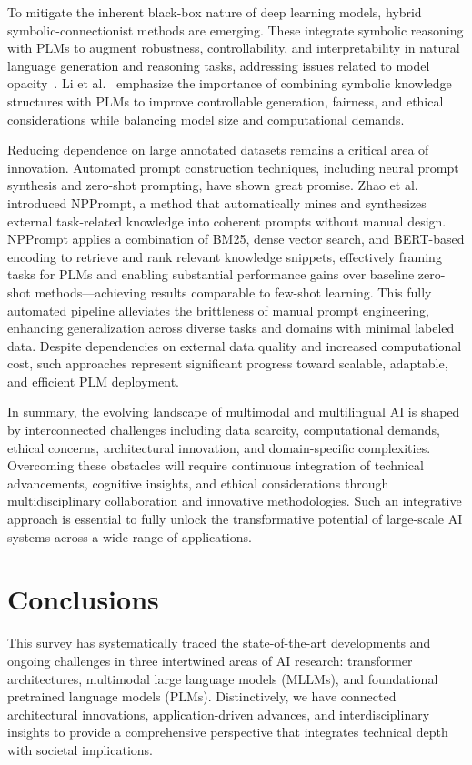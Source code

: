 \documentclass[sigconf]{acmart}
\begin{document}
To mitigate the inherent black-box nature of deep learning models, hybrid symbolic-connectionist methods are emerging. These integrate symbolic reasoning with PLMs to augment robustness, controllability, and interpretability in natural language generation and reasoning tasks, addressing issues related to model opacity~\cite{ref39}. Li et al.~\cite{ref39} emphasize the importance of combining symbolic knowledge structures with PLMs to improve controllable generation, fairness, and ethical considerations while balancing model size and computational demands.

Reducing dependence on large annotated datasets remains a critical area of innovation. Automated prompt construction techniques, including neural prompt synthesis and zero-shot prompting, have shown great promise. Zhao et al.~\cite{ref40} introduced NPPrompt, a method that automatically mines and synthesizes external task-related knowledge into coherent prompts without manual design. NPPrompt applies a combination of BM25, dense vector search, and BERT-based encoding to retrieve and rank relevant knowledge snippets, effectively framing tasks for PLMs and enabling substantial performance gains over baseline zero-shot methods—achieving results comparable to few-shot learning. This fully automated pipeline alleviates the brittleness of manual prompt engineering, enhancing generalization across diverse tasks and domains with minimal labeled data. Despite dependencies on external data quality and increased computational cost, such approaches represent significant progress toward scalable, adaptable, and efficient PLM deployment.

\bigskip

In summary, the evolving landscape of multimodal and multilingual AI is shaped by interconnected challenges including data scarcity, computational demands, ethical concerns, architectural innovation, and domain-specific complexities. Overcoming these obstacles will require continuous integration of technical advancements, cognitive insights, and ethical considerations through multidisciplinary collaboration and innovative methodologies. Such an integrative approach is essential to fully unlock the transformative potential of large-scale AI systems across a wide range of applications.

\section{Conclusions}

This survey has systematically traced the state-of-the-art developments and ongoing challenges in three intertwined areas of AI research: transformer architectures, multimodal large language models (MLLMs), and foundational pretrained language models (PLMs). Distinctively, we have connected architectural innovations, application-driven advances, and interdisciplinary insights to provide a comprehensive perspective that integrates technical depth with societal implications.
\end{document}
